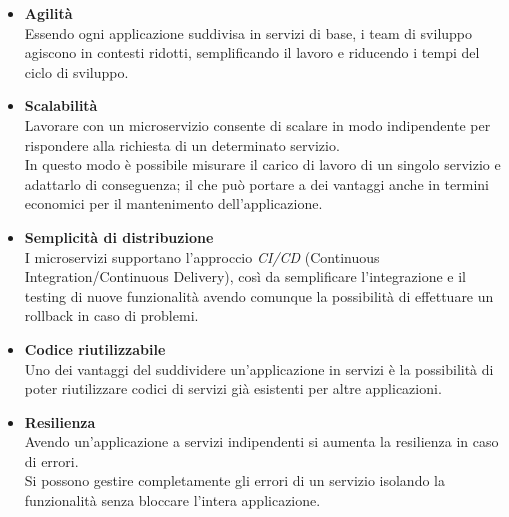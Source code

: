 \begin{itemize}
	\item \textbf{Agilità}\\ Essendo ogni applicazione suddivisa in servizi di base, i team di sviluppo agiscono in contesti ridotti, semplificando il lavoro e riducendo i tempi del ciclo di sviluppo.
	\item \textbf{Scalabilità}\\Lavorare con un microservizio consente di scalare in modo indipendente per rispondere alla richiesta di un determinato servizio.\\ In questo modo è possibile misurare il carico di lavoro di un singolo servizio e adattarlo di conseguenza; il che può portare a dei vantaggi anche in termini economici per il mantenimento dell'applicazione. 
	\item \textbf{Semplicità di distribuzione}\\ I microservizi supportano l'approccio \emph{CI/CD} (Continuous Integration/Continuous Delivery), così da semplificare l'integrazione e il testing di nuove funzionalità avendo comunque la possibilità di effettuare un rollback in caso di problemi.
	\item \textbf{Codice riutilizzabile}\\ Uno dei vantaggi del suddividere un'applicazione in servizi è la possibilità di poter riutilizzare codici di servizi già esistenti per altre applicazioni.
	\item \textbf{Resilienza}\\ Avendo un'applicazione a servizi indipendenti si aumenta la resilienza in caso di errori.\\ Si possono gestire completamente gli errori di un servizio isolando la funzionalità senza bloccare l'intera applicazione.
\end{itemize}

